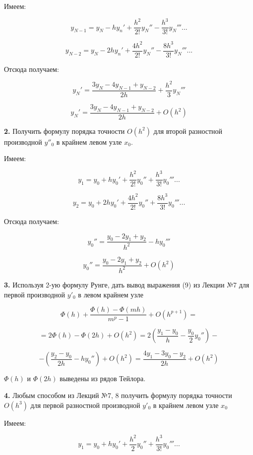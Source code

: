 \documentclass[a4paper,12pt]{article}
\begin{document}
\noindent Имеем: 

$$ y_{N - 1} = y_{N} - h y_{n}' + \frac{h^2}{2!}y_{N}'' - \frac{h^3}{3!}y_{N}'''...$$

$$ y_{N - 2} = y_{N} - 2h y_{n}' + \frac{4h^2}{2!}y_{N}'' - \frac{8h^3}{3!}y_{N}'''...$$

\noindent Отсюда получаем:

$$ y_{N}' = \frac{3y_{N} - 4y_{N - 1} + y_{N - 2}}{2h} + \frac{h^2}{3}y_{N}''' $$

$$ y_{N}' = \frac{3y_{N} - 4y_{N - 1} + y_{N - 2}}{2h} + O(h^2)$$

\noindent\textbf{2.}  Получить формулу порядка точности $O(h^2) $ для второй разностной производной $y''_{0}$ в крайнем левом узле $x_{0}$. \newline

\noindent Имеем:

$$ y_{1} = y_{0} + h y_{0}' + \frac{h^2}{2!}y_{0}'' + \frac{h^3}{3!}y_{0}'''...$$

$$ y_{2} = y_{0} + 2h y_{0}' + \frac{4h^2}{2!}y_{0}'' + \frac{8h^3}{3!}y_{0}'''...$$

\noindent Отсюда получаем: 

$$ y_{0}'' = \frac{y_{0} - 2y_{1} + y_{2}}{h^2} - hy_{0}''' $$

$$ y_{0}'' = \frac{y_{0} - 2y_{1} + y_{2}}{h^2} + O(h^2)$$


\noindent\textbf{3.} Используя 2-ую формулу Рунге, дать вывод выражения (9) из Лекции №7 для первой производной $y'_{0}$ в левом крайнем узле \newline

$$ \Phi(h) + \frac{\Phi(h) - \Phi(mh)}{m^p - 1} + O(h^{p + 1})= $$

$$ = 2\Phi(h) - \Phi(2h) + O(h^2) = 2(\frac{y_{1} - y_{0}}{h} - \frac{y_{0}}{2}y_{0}'') - $$

$$ - (\frac{y_{2} - y_{0}}{2h} - hy_{0}'') + O(h^2) = \frac{4y_{1} - 3y_{0} - y_{2}}{2h} + O(h^2)$$\newline

\noindent $\Phi(h)$ и $\Phi(2h)$ выведены из рядов Тейлора.\newline

\noindent\textbf{4.} Любым способом из Лекций №7, 8 получить формулу порядка точности $O(h^3)$ для первой разностной производной $y'_{0}$ в крайнем левом узле $x_{0}$ \newline

\noindent Имеем: 

$$ y_{1} = y_{0} + hy_{0}' + \frac{h^2}{2}y_{0}''+\frac{h^3}{3!}y_{0}'''...$$
\end{document}

